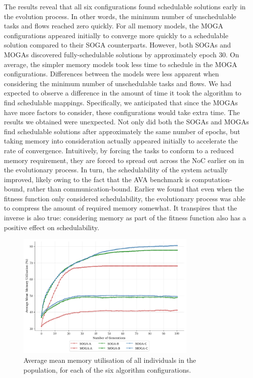 \documentclass[conference]{IEEEtran}
\begin{document}
The results reveal that all six configurations found schedulable solutions early in the evolution process. In other words, the minimum number of unschedulable tasks and flows reached zero quickly. For all memory models, the MOGA configurations appeared initially to converge more quickly to a schedulable solution compared to their SOGA counterparts. However, both SOGAs and MOGAs discovered fully-schedulable solutions by approximately epoch 30. On average, the simpler memory  models took less time to schedule in the MOGA configurations. Differences between the models were less apparent when considering the minimum number of unschedulable tasks and flows. We had expected to observe a difference in the amount of time it took the algorithm to find schedulable mappings. Specifically, we anticipated that since the MOGAs have more factors to consider, these configurations would take extra time. The results we obtained were unexpected. Not only did both the SOGAs and MOGAs find schedulable solutions after approximately the same number of epochs, but taking memory into consideration actually appeared initially to accelerate the rate of convergence. Intuitively, by forcing the tasks to conform to a reduced memory requirement, they are forced to spread out across the NoC earlier on in the evolutionary process. In turn, the schedulability of the system actually improved, likely owing to the fact that the AVA benchmark is computation-bound, rather than communication-bound. Earlier we found that even when the fitness function only considered schedulability, the evolutionary process was able to compress the amount of required memory somewhat. It transpires that the inverse is also true: considering memory as part of the fitness function also has a positive effect on schedulability.

\begin{figure}[!t]
  \centering
  \includegraphics*[width=8.8cm,keepaspectratio]{img/mean_memory_util_generations}
\vspace{-4ex}
  \caption{Average mean memory utilisation of all individuals in the population, for each of the six algorithm configurations.}
  \label{fig:average_memory_utilisation_generations}
\vspace{-2ex}
\end{figure}
\end{document}
